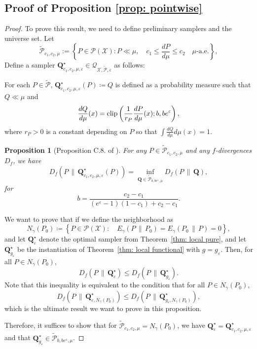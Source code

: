 \documentclass[accepted]{article}
\theoremstyle{plain} %
\newtheorem{proposition}[theorem]{Proposition}
\theoremstyle{definition}
\theoremstyle{remark}
\newcommand{\eps}{\varepsilon}
\newcommand{\bQ}{\mathbf{Q}}
\newcommand{\ngb}{N_\gamma(P_0)}
\newcommand{\Pt}{\tilde{\mathcal{P}}}
\newcommand{\Ptm}
{\tilde{\mathcal{P}}_{c_1, c_2, \mu}}
\begin{document}
\subsection{Proof of Proposition \ref{prop: pointwise}}\label{appendix: proof pointwise}
\begin{proof}
    To prove this result, we need to define preliminary samplers and the universe set. Let
\[
\tilde{\mathcal{P}}_{c_1, c_2, \mu}
:= \left\{ P \in \mathcal{P}(\mathcal{X}) : P \ll \mu, \quad c_1 \leq \frac{dP}{d\mu} \leq c_2 \quad \mu\text{-a.e.} \right\},
\]
Define a sampler $\mathbf{Q}^\star_{c_1,c_2,\mu,\eps} \in \mathcal{Q}_{\mathcal{X}, \tilde{\mathcal{P}}, \eps}$ as follows:

For each  $P \in \tilde{\mathcal{P}}$, $\mathbf{Q}^\star_{c_1,c_2,\mu,\eps}(P) \coloneqq Q$ is defined as a probability measure such that $Q \ll \mu$  and
\[
\frac{dQ}{d\mu}(x) = \textnormal{clip} \left( \frac{1}{r_P} \frac{dP}{d\mu}(x) ; b, b e^{\eps} \right),
\]
where  $r_P > 0$ is a constant depending on  $P$ so that  $\int \frac{dQ}{d\mu} d\mu(x) = 1$.

\begin{proposition}[Proposition C.8. of \citet{park2024exactly}]\label{prop: pointwise optimal Park et al.}
For any $P \in \Ptm$ and any $f$-divergences $D_f$, we have
    \[
D_f\left(P \,\|\, \mathbf{Q}^\star_{c_1,c_2,\mu,\eps}(P)\right)
= \inf_{\bQ \in \Pt_{b,be^\eps,\mu}} D_f(P \,\|\, \bQ),
\]
for \[
b = \frac{c_2 - c_1}{(e^{\eps} - 1)(1 - c_1) + c_2 - c_1}.
\]
\end{proposition}
We want to prove that if we define the neighborhood as 
\begin{equation*}
N_\gamma(P_0) \coloneqq  \left\{ P \in \mathcal{P}(\mathcal{X}) :\quad E_\gamma(P \, \| \, P_0) =  E_\gamma(P_0 \, \| \, P) = 0  \right\},
\end{equation*}
and let \( \bQ^\star_\varepsilon \) denote the optimal sampler from Theorem~\ref{thm: local pure}, and let \( \bQ^\star_{g_\varepsilon} \) be the instantiation of Theorem~\ref{thm: local functional} with \( g = g_\varepsilon \). Then, for all \( P \in N_\gamma(P_0) \),
\[
D_f(P \,\|\, \bQ^\star_\varepsilon) \leq D_f(P \,\|\, \bQ^\star_{g_\varepsilon}).
\]
Note that this inequality is equivalent to the condition that for all \( P \in N_\gamma(P_0) \),
\[
D_f(P \,\|\, \bQ^\star_{\varepsilon,\ngb}) \leq D_f(P \,\|\, \bQ^\star_{g_\varepsilon,\ngb}),
\]
which is the ultimate result we want to prove in this proposition. 

Therefore, it suffices to show that for $\Ptm = \ngb$, we have $\bQ^\star_\eps = \mathbf{Q}^\star_{c_1,c_2,\mu,\eps}$ and that $\bQ^\star_{g_\varepsilon} \in \Pt_{b,be^\eps,\mu}$.


\end{proof}
\end{document}
